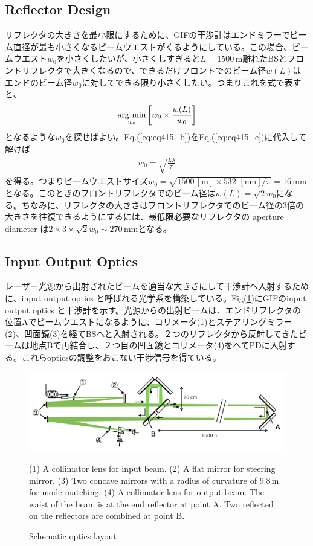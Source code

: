 \subsection{Reflector Design}
リフレクタの大きさを最小限にするために、GIFの干渉計はエンドミラーでビーム直径が最も小さくなるビームウエストがくるようにしている。この場合、ビームウエスト$w_0$を小さくしたいが、小さくしすぎると$L=1500\,\mathrm{m}$離れたBSとフロントリフレクタで大きくなるので、できるだけフロントでのビーム径$w(L)$はエンドのビーム径$w_0$に対してできる限り小さくしたい。つまりこれを式で表すと、
\begin{eqnarray}
  \mathop{\rm arg~min}\limits_{w_0} \left[w_0\times\frac{w(L)}{w_0}\right] \label{eq:eq415_e}
\end{eqnarray}
となるような$w_0$を探せばよい。Eq.(\ref{eq:eq415_b})をEq.(\ref{eq:eq415_e})に代入して解けば
\begin{eqnarray}
  w_0 = \sqrt{\frac{{L\lambda}}{\pi}}
\end{eqnarray}
を得る。つまりビームウエストサイズ$w_0=\sqrt{{1500\,\mathrm{[m]}}\times 532\,\,\mathrm{[nm]}/\pi} = 16\,\mathrm{mm}$となる。このときのフロントリフレクタでのビーム径は$w(L)=\sqrt{2}{w_0}$になる。ちなみに、リフレクタの大きさはフロントリフレクタでのビーム径の3倍の大きさを往復できるようにするには、最低限必要なリフレクタの aperture diameter は$2\times3\times\sqrt{2}w_0\sim270\,\mathrm{mm}$となる。

\subsection{Input Output Optics}
レーザー光源から出射されたビームを適当な大きさにして干渉計へ入射するために、input output optics と呼ばれる光学系を構築している。Fig(\ref{img:img416})にGIFのinput output optics と干渉計を示す。光源からの出射ビームは、エンドリフレクタの位置Aでビームウエストになるように、コリメータ(1)とステアリングミラー(2)、凹面鏡(3)を経てBSへと入射される。２つのリフレクタから反射してきたビームは地点Bで再結合し、２つ目の凹面鏡とコリメータ(4)をへてPDに入射する。これらopticsの調整をおこない干渉信号を得ている\cite{miyo2017baseline}。

\begin{figure}[h]
  \begin{center}   
    \includegraphics[width=14cm]{./img_chap4/img416.png}
    \caption{Schematic optics layout}{(1) A collimator lens for input beam. (2) A flat mirror for steering mirror. (3) Two concave mirrors with a radius of curvature of $9.8\,\mathrm{m}$ for mode matching. (4) A collimator lens for output beam. The waist of the beam is at the end reflector at point A. Two reflected on the reflectors are combined at point B.}\label{img:img416}
  \end{center}
\end{figure}


